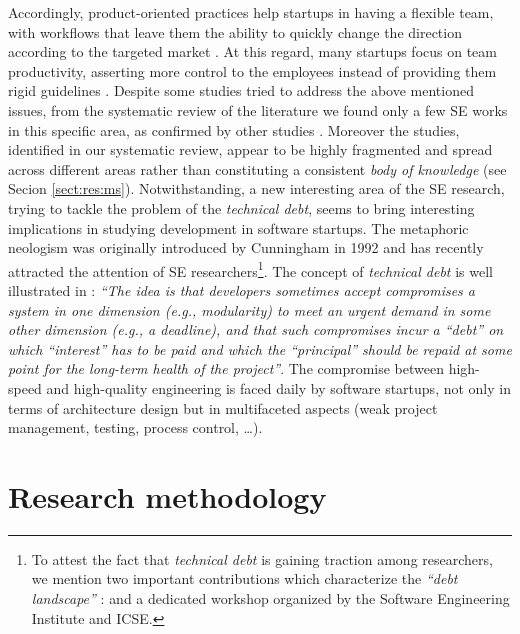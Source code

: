 \documentclass[final,5p,times,twocolumn]{elsarticle}
\begin{document}
Accordingly, product-oriented practices help startups in having a flexible team, with workflows that leave them the ability to quickly change the direction according to the targeted market  \cite{Heitlager2007,Sutton2000}. At this regard, many startups focus on team productivity, asserting more control to the employees instead of providing them rigid guidelines \cite{Tanabian2005, Chorev2006, Kakati2003}. Despite some studies tried to address the above mentioned issues, from the systematic review of the literature we found only a few SE works in this specific area, as confirmed by other studies \cite{Coleman2008, Coleman2008a, Coleman2007, Sutton2000}. Moreover the studies, identified in our systematic review, appear to be highly fragmented and spread across different areas rather than constituting a consistent \textit{body of knowledge} (see Secion \ref{sect:res:ms}).
Notwithstanding, a new interesting area of the SE research, trying to tackle the problem of the \textit{technical debt}, seems to bring interesting implications in studying development in software startups. The metaphoric neologism was originally introduced by Cunningham in 1992 \cite{TechnicalDebtCunn} and has recently attracted the attention of SE researchers\footnote{To attest the fact that \textit{technical debt} is gaining traction among researchers, we mention two important contributions which characterize the \textit{``debt landscape''} : \cite{Nugroho2011,Izurieta2012} and a dedicated workshop \cite{workshopDebt} organized by the Software Engineering Institute  and ICSE.}. The concept of \textit{technical debt} is well illustrated in \cite{Brown:2010:MTD:1882362.1882373} : \textit{``The idea is that developers sometimes accept compromises a system in one dimension (e.g., modularity) to meet an urgent demand in some other dimension (e.g., a deadline), and that such compromises incur a ``debt'' on which ``interest'' has to be paid and which the ``principal'' should be repaid at some point for the long-term health of the project''}.  The compromise between high-speed and high-quality engineering is faced daily by software startups, not only in terms of architecture design but in multifaceted aspects (weak project management, testing, process control, \ldots).


\section{Research methodology} %
 \label{sect:method}
\end{document}
